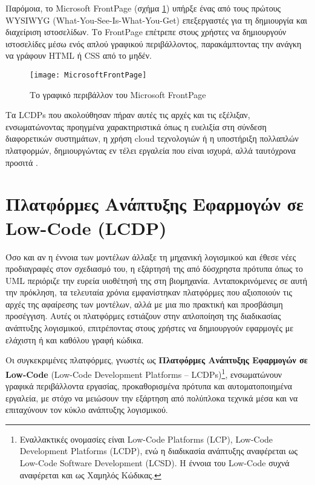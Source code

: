             Παρόμοια, το Microsoft FrontPage (σχήμα \ref{fig:MicrosoftFrontPage}) υπήρξε ένας από τους πρώτους WYSIWYG (What-You-See-Is-What-You-Get) επεξεργαστές για τη δημιουργία και διαχείριση ιστοσελίδων. Το FrontPage επέτρεπε στους χρήστες να δημιουργούν ιστοσελίδες μέσω ενός απλού γραφικού περιβάλλοντος, παρακάμπτοντας την ανάγκη να γράφουν HTML ή CSS από το μηδέν.

            \begin{figure}[h!] \noindent \centering
                \texttt{[image: MicrosoftFrontPage]}
                \caption{\centering Το γραφικό περιβάλλον του Microsoft FrontPage}
                \label{fig:MicrosoftFrontPage}
            \end{figure}

            Τα LCDPs που ακολούθησαν πήραν αυτές τις αρχές και τις εξέλιξαν, ενσωματώνοντας προηγμένα χαρακτηριστικά όπως η ευελιξία στη σύνδεση διαφορετικών συστημάτων, η χρήση cloud τεχνολογιών ή η υποστήριξη πολλαπλών πλατφορμών, δημιουργώντας εν τέλει εργαλεία που είναι ισχυρά, αλλά ταυτόχρονα προσιτά \cite{LowCodeSimon}.


    \section{Πλατφόρμες Ανάπτυξης Εφαρμογών σε Low-Code (LCDP)} \label{sec:LCDP}
        Όσο και αν η έννοια των μοντέλων άλλαξε τη μηχανική λογισμικού και έθεσε νέες προδιαγραφές στον σχεδιασμό του, η εξάρτησή της από δύσχρηστα πρότυπα όπως το UML περιόριζε την ευρεία υιοθέτησή της στη βιομηχανία. Ανταποκρινόμενες σε αυτή την πρόκληση, τα τελευταία χρόνια εμφανίστηκαν πλατφόρμες που αξιοποιούν τις αρχές της αφαίρεσης των μοντέλων, αλλά με μια πιο πρακτική και προσβάσιμη προσέγγιση. Αυτές οι πλατφόρμες εστιάζουν στην απλοποίηση της διαδικασίας ανάπτυξης λογισμικού, επιτρέποντας στους χρήστες να δημιουργούν εφαρμογές με ελάχιστη ή και καθόλου γραφή κώδικα.

        Οι συγκεκριμένες πλατφόρμες, γνωστές ως \textbf{Πλατφόρμες Ανάπτυξης Εφαρμογών σε Low-Code} (Low-Code Development Platforms -- LCDPs)\footnote{Εναλλακτικές ονομασίες είναι Low-Code Platforms (LCP), Low-Code Development Platforms (LCDP), ενώ η διαδικασία ανάπτυξης αναφέρεται ως Low-Code Software Development (LCSD). Η έννοια του Low-Code συχνά αναφέρεται και ως Χαμηλός Κώδικας.}, ενσωματώνουν γραφικά περιβάλλοντα εργασίας, προκαθορισμένα πρότυπα και αυτοματοποιημένα εργαλεία, με στόχο να μειώσουν την εξάρτηση από πολύπλοκα τεχνικά μέσα και να επιταχύνουν τον κύκλο ανάπτυξης λογισμικού. \cite{Bock2021}

